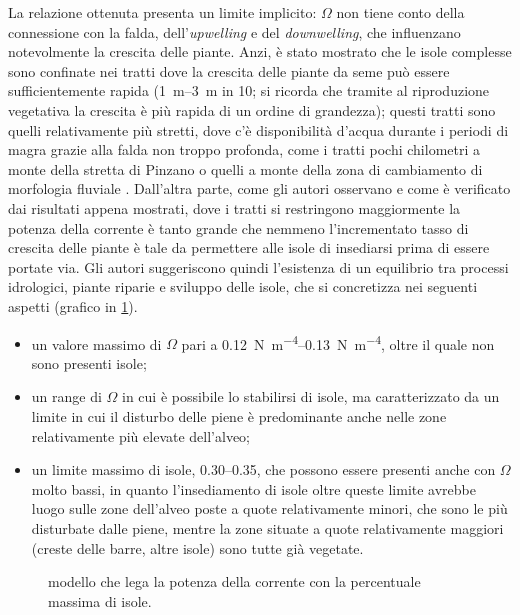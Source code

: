La relazione ottenuta presenta un limite implicito: $\Omega$ non tiene conto della connessione con la falda, dell'\emph{upwelling} e del \emph{downwelling}, che influenzano notevolmente la crescita delle piante.
Anzi, è stato mostrato che le isole complesse sono confinate nei tratti dove la crescita delle piante da seme può essere sufficientemente rapida (\SIrange[range-phrase={-}]{1}{3}{\m} in \SI{10}{\anni}; si ricorda che tramite al riproduzione vegetativa la crescita è più rapida di un ordine di grandezza); questi tratti sono quelli relativamente più stretti, dove c'è disponibilità d'acqua durante i periodi di magra grazie alla falda non troppo profonda, come i tratti pochi chilometri a monte della stretta di Pinzano o quelli a monte della zona di cambiamento di morfologia fluviale .
Dall'altra parte, come gli autori osservano e come è verificato dai risultati appena mostrati, dove i tratti si restringono maggiormente la potenza della corrente è tanto grande che nemmeno l'incrementato tasso di crescita delle piante è tale da permettere alle isole di insediarsi prima di essere portate via.
Gli autori suggeriscono quindi l'esistenza di un equilibrio tra processi idrologici, piante riparie e sviluppo delle isole, che si concretizza nei seguenti aspetti (grafico in \cref{graph:omega-area-percentuale-linear-modello}).
%
\begin{itemize}
	\item un valore massimo di $\Omega$ pari a \SIrange[range-phrase={-}]{0.12}{0.13}{\newton\per\metre\tothe{4}}, oltre il quale non sono presenti isole;
	\item un range di $\Omega$ in cui è possibile lo stabilirsi di isole, ma caratterizzato da un limite in cui il disturbo delle piene è predominante anche nelle zone relativamente più elevate dell'alveo;
	\item un limite massimo di isole, \numrange[range-phrase={-}]{0.30}{0.35}, che possono essere presenti anche con $\Omega$ molto bassi, in quanto l'insediamento di isole oltre queste limite avrebbe luogo sulle zone dell'alveo poste a quote relativamente minori, che sono le più disturbate dalle piene, mentre la zone situate a quote relativamente maggiori (creste delle barre, altre isole) sono tutte già vegetate.
\end{itemize}
%
%
\begin{figure}
	\centering
	
	\caption[modello che lega la potenza della corrente con la percentuale massima di isole]{modello che lega la potenza della corrente con la percentuale massima di isole.}
	\label{graph:omega-area-percentuale-linear-modello}
\end{figure}
%
